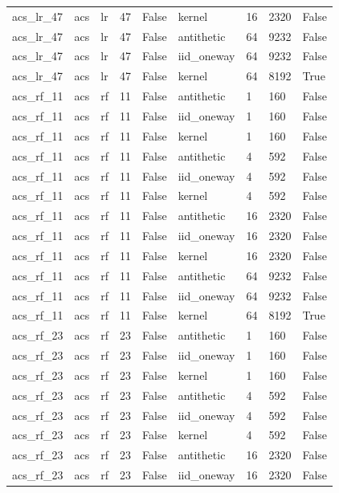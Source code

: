 \begin{tabular}{lllllllll}
acs\_lr\_47 & acs & lr & 47 & False & kernel & 16 & 2320 & False \\
acs\_lr\_47 & acs & lr & 47 & False & antithetic & 64 & 9232 & False \\
acs\_lr\_47 & acs & lr & 47 & False & iid\_oneway & 64 & 9232 & False \\
acs\_lr\_47 & acs & lr & 47 & False & kernel & 64 & 8192 & True \\
acs\_rf\_11 & acs & rf & 11 & False & antithetic & 1 & 160 & False \\
acs\_rf\_11 & acs & rf & 11 & False & iid\_oneway & 1 & 160 & False \\
acs\_rf\_11 & acs & rf & 11 & False & kernel & 1 & 160 & False \\
acs\_rf\_11 & acs & rf & 11 & False & antithetic & 4 & 592 & False \\
acs\_rf\_11 & acs & rf & 11 & False & iid\_oneway & 4 & 592 & False \\
acs\_rf\_11 & acs & rf & 11 & False & kernel & 4 & 592 & False \\
acs\_rf\_11 & acs & rf & 11 & False & antithetic & 16 & 2320 & False \\
acs\_rf\_11 & acs & rf & 11 & False & iid\_oneway & 16 & 2320 & False \\
acs\_rf\_11 & acs & rf & 11 & False & kernel & 16 & 2320 & False \\
acs\_rf\_11 & acs & rf & 11 & False & antithetic & 64 & 9232 & False \\
acs\_rf\_11 & acs & rf & 11 & False & iid\_oneway & 64 & 9232 & False \\
acs\_rf\_11 & acs & rf & 11 & False & kernel & 64 & 8192 & True \\
acs\_rf\_23 & acs & rf & 23 & False & antithetic & 1 & 160 & False \\
acs\_rf\_23 & acs & rf & 23 & False & iid\_oneway & 1 & 160 & False \\
acs\_rf\_23 & acs & rf & 23 & False & kernel & 1 & 160 & False \\
acs\_rf\_23 & acs & rf & 23 & False & antithetic & 4 & 592 & False \\
acs\_rf\_23 & acs & rf & 23 & False & iid\_oneway & 4 & 592 & False \\
acs\_rf\_23 & acs & rf & 23 & False & kernel & 4 & 592 & False \\
acs\_rf\_23 & acs & rf & 23 & False & antithetic & 16 & 2320 & False \\
acs\_rf\_23 & acs & rf & 23 & False & iid\_oneway & 16 & 2320 & False \\

\end{tabular}
